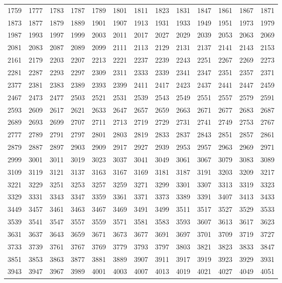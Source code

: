 \documentclass[12pt, a4paper]{article}
\begin{document}
\begin{longtable}{lllll lllll lll}
1759 &1777 &1783 &1787 &1789 &1801 &1811 &1823 &1831 &1847 &1861 &1867 &1871 \\
1873 &1877 &1879 &1889 &1901 &1907 &1913 &1931 &1933 &1949 &1951 &1973 &1979 \\
1987 &1993 &1997 &1999 &2003 &2011 &2017 &2027 &2029 &2039 &2053 &2063 &2069 \\
2081 &2083 &2087 &2089 &2099 &2111 &2113 &2129 &2131 &2137 &2141 &2143 &2153 \\
2161 &2179 &2203 &2207 &2213 &2221 &2237 &2239 &2243 &2251 &2267 &2269 &2273 \\
2281 &2287 &2293 &2297 &2309 &2311 &2333 &2339 &2341 &2347 &2351 &2357 &2371 \\
2377 &2381 &2383 &2389 &2393 &2399 &2411 &2417 &2423 &2437 &2441 &2447 &2459 \\
2467 &2473 &2477 &2503 &2521 &2531 &2539 &2543 &2549 &2551 &2557 &2579 &2591 \\
2593 &2609 &2617 &2621 &2633 &2647 &2657 &2659 &2663 &2671 &2677 &2683 &2687 \\
2689 &2693 &2699 &2707 &2711 &2713 &2719 &2729 &2731 &2741 &2749 &2753 &2767 \\
2777 &2789 &2791 &2797 &2801 &2803 &2819 &2833 &2837 &2843 &2851 &2857 &2861 \\
2879 &2887 &2897 &2903 &2909 &2917 &2927 &2939 &2953 &2957 &2963 &2969 &2971 \\
2999 &3001 &3011 &3019 &3023 &3037 &3041 &3049 &3061 &3067 &3079 &3083 &3089 \\
3109 &3119 &3121 &3137 &3163 &3167 &3169 &3181 &3187 &3191 &3203 &3209 &3217 \\
3221 &3229 &3251 &3253 &3257 &3259 &3271 &3299 &3301 &3307 &3313 &3319 &3323 \\
3329 &3331 &3343 &3347 &3359 &3361 &3371 &3373 &3389 &3391 &3407 &3413 &3433 \\
3449 &3457 &3461 &3463 &3467 &3469 &3491 &3499 &3511 &3517 &3527 &3529 &3533 \\
3539 &3541 &3547 &3557 &3559 &3571 &3581 &3583 &3593 &3607 &3613 &3617 &3623 \\
3631 &3637 &3643 &3659 &3671 &3673 &3677 &3691 &3697 &3701 &3709 &3719 &3727 \\
3733 &3739 &3761 &3767 &3769 &3779 &3793 &3797 &3803 &3821 &3823 &3833 &3847 \\
3851 &3853 &3863 &3877 &3881 &3889 &3907 &3911 &3917 &3919 &3923 &3929 &3931 \\
3943 &3947 &3967 &3989 &4001 &4003 &4007 &4013 &4019 &4021 &4027 &4049 &4051 \\

\end{longtable}
\end{document}

